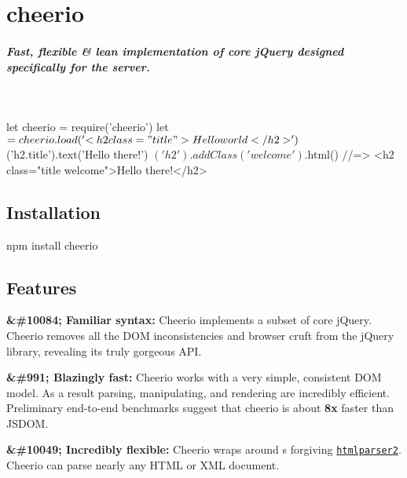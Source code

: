 \section*{cheerio}

\subparagraph*{Fast, flexible \& lean implementation of core j\+Query designed specifically for the server.}

 \href{http://travis-ci.org/cheeriojs/cheerio}{\tt } \href{https://coveralls.io/r/cheeriojs/cheerio}{\tt } \href{https://gitter.im/cheeriojs/cheerio?utm_source=badge&utm_medium=badge&utm_campaign=pr-badge&utm_content=badge}{\tt } \href{#backers}{\tt } \href{#sponsors}{\tt } 

~\newline



\begin{DoxyCode}
let cheerio = require('cheerio')
let $ = cheerio.load('<h2 class="title">Hello world</h2>')

$('h2.title').text('Hello there!')
$('h2').addClass('welcome')

$.html()
//=> <h2 class="title welcome">Hello there!</h2>
\end{DoxyCode}


\subsection*{Installation}

{\ttfamily npm install cheerio}

\subsection*{Features}

{\bfseries \&\#10084; Familiar syntax\+:} Cheerio implements a subset of core j\+Query. Cheerio removes all the D\+OM inconsistencies and browser cruft from the j\+Query library, revealing its truly gorgeous A\+PI.

{\bfseries \&\#991; Blazingly fast\+:} Cheerio works with a very simple, consistent D\+OM model. As a result parsing, manipulating, and rendering are incredibly efficient. Preliminary end-\/to-\/end benchmarks suggest that cheerio is about {\bfseries 8x} faster than J\+S\+D\+OM.

{\bfseries \&\#10049; Incredibly flexible\+:} Cheerio wraps around \textquotesingle{}s forgiving \href{https://github.com/fb55/htmlparser2/}{\tt htmlparser2}. Cheerio can parse nearly any H\+T\+ML or X\+ML document.

